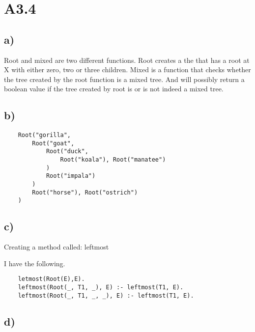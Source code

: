 \section{A3.4}
\subsection{a)}
Root and mixed are two different functions.
Root creates a the that has a root at X with either zero, two or three children.
Mixed is a function that checks whether the tree created by the root function is
a mixed tree. And will possibly return a boolean value if the tree created by root
is or is not indeed a mixed tree.

\subsection{b)}
\begin{verbatim}
    Root("gorilla",
        Root("goat",
            Root("duck",
                Root("koala"), Root("manatee")
            )
            Root("impala")
        )
        Root("horse"), Root("ostrich")
    )
\end{verbatim}

\subsection{c)}
Creating a method called: leftmost

I have the following.

\begin{verbatim}
    letmost(Root(E),E).
    leftmost(Root(_, T1, _), E) :- leftmost(T1, E).
    leftmost(Root(_, T1, _, _), E) :- leftmost(T1, E).
\end{verbatim}

\subsection{d)}